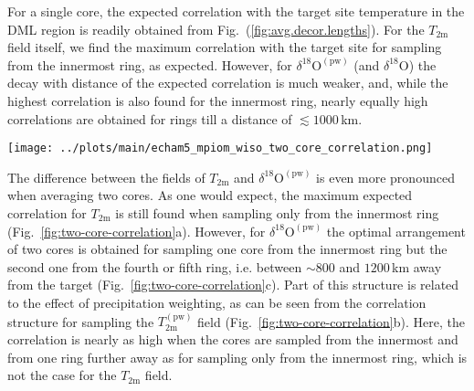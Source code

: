 \documentclass[cp, manuscript]{copernicus}
\begin{document}
For a single core, the expected correlation with the target site temperature in
the DML region is readily obtained from Fig.~(\ref{fig:avg.decor.lengths}). For
the $T_{\mathrm{2m}}$ field itself, we find the maximum correlation with the
target site for sampling from the innermost ring, as expected. However, for
$\delta^{18}\mathrm{O}^{\mathrm{(pw)}}$ (and $\delta^{18}\mathrm{O}$) the decay
with distance of the expected correlation is much weaker, and, while the highest
correlation is also found for the innermost ring, nearly equally high
correlations are obtained for rings till a distance of $\lesssim1000$\,km.

\begin{figure*}[t]%
\centering
\texttt{[image: ../plots/main/echam5\_mpiom\_wiso\_two\_core\_correlation.png]}
\caption{%
  The expected correlation with the target site temperature in the DML region as
  a function of distance for averaging two cores. Shown is the mean correlation
  across all possible single correlations from averaging two $T_{\mathrm{2m}}$
  (\textbf{a}), $T_{\mathrm{2m}}^{\mathrm{(pw)}}$ (\textbf{b}) and
  $\delta^{18}\mathrm{O}^{\mathrm{(pw)}}$ (\textbf{c}) time series of grid cells
  sampled from the same or from two different ring bins. The axes display the
  distance from the target of the inner radius of the sampled ring bin, where
  the $x$ ($y$) axis stands for the first (second) sampled ring. \#ADD labels to
  the figure: (a) is left, (b) middle, (c) right.}
\label{fig:two-core-correlation}%
\end{figure*}%

The difference between the fields of $T_{\mathrm{2m}}$ and
$\delta^{18}\mathrm{O}^{\mathrm{(pw)}}$ is even more pronounced when averaging
two cores. As one would expect, the maximum expected correlation for
$T_{\mathrm{2m}}$ is still found when sampling only from the innermost ring
(Fig.~\ref{fig:two-core-correlation}a). However, for
$\delta^{18}\mathrm{O}^{\mathrm{(pw)}}$ the optimal arrangement of two cores is
obtained for sampling one core from the innermost ring but the second one from
the fourth or fifth ring, i.e. between $\sim800$ and $1200$\,km away from the
target (Fig.~\ref{fig:two-core-correlation}c). Part of this structure is related
to the effect of precipitation weighting, as can be seen from the correlation
structure for sampling the $T_{\mathrm{2m}}^{\mathrm{(pw)}}$ field
(Fig.~\ref{fig:two-core-correlation}b). Here, the correlation is nearly as high
when the cores are sampled from the innermost and from one ring further away as
for sampling only from the innermost ring, which is not the case for the
$T_{\mathrm{2m}}$ field.
\end{document}
